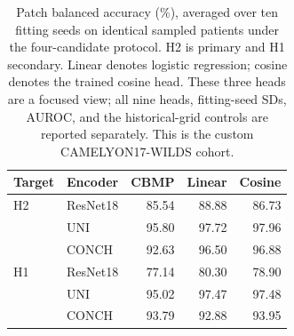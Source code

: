 \begin{table}[t]
\centering\small
\setlength{\tabcolsep}{3pt}
\begin{tabular}{llrrr}
\hline
Target & Encoder & CBMP & Linear & Cosine \\
\hline
H2 & ResNet18 & 85.54 & 88.88 & 86.73 \\
   & UNI      & 95.80 & 97.72 & 97.96 \\
   & CONCH    & 92.63 & 96.50 & 96.88 \\
\hline
H1 & ResNet18 & 77.14 & 80.30 & 78.90 \\
   & UNI      & 95.02 & 97.47 & 97.48 \\
   & CONCH    & 93.79 & 92.88 & 93.95 \\
\hline
\end{tabular}
\caption{Patch balanced accuracy (\%), averaged over ten fitting seeds on identical sampled patients under the four-candidate protocol. H2 is primary and H1 secondary. Linear denotes logistic regression; cosine denotes the trained cosine head. These three heads are a focused view; all nine heads, fitting-seed SDs, AUROC, and the historical-grid controls are reported separately. This is the custom CAMELYON17-WILDS cohort.}
\label{tab:foundation_heads}
\end{table}
